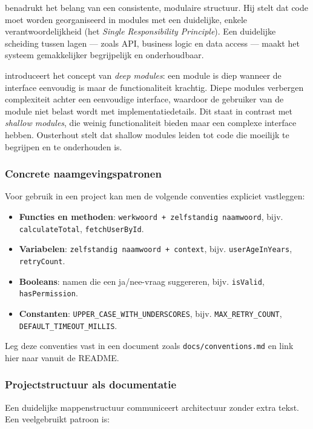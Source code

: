 \textcite{martin2008clean} benadrukt het belang van een consistente, modulaire structuur. Hij stelt dat code moet worden georganiseerd in modules met een duidelijke, enkele verantwoordelijkheid (het \textit{Single Responsibility Principle}). Een duidelijke scheiding tussen lagen --- zoals API, business logic en data access --- maakt het systeem gemakkelijker begrijpelijk en onderhoudbaar.

\textcite{ousterhout2018philosophy} introduceert het concept van \textit{deep modules}: een module is diep wanneer de interface eenvoudig is maar de functionaliteit krachtig. Diepe modules verbergen complexiteit achter een eenvoudige interface, waardoor de gebruiker van de module niet belast wordt met implementatiedetails. Dit staat in contrast met \textit{shallow modules}, die weinig functionaliteit bieden maar een complexe interface hebben. Ousterhout stelt dat shallow modules leiden tot code die moeilijk te begrijpen en te onderhouden is.

\subsubsection{Concrete naamgevingspatronen}
Voor gebruik in een project kan men de volgende conventies expliciet vastleggen:

\begin{itemize}
    \item \textbf{Functies en methoden}: \texttt{werkwoord + zelfstandig naamwoord}, bijv. \texttt{calculateTotal}, \texttt{fetchUserById}.
    \item \textbf{Variabelen}: \texttt{zelfstandig naamwoord + context}, bijv. \texttt{userAgeInYears}, \texttt{retryCount}.
    \item \textbf{Booleans}: namen die een ja/nee-vraag suggereren, bijv. \texttt{isValid}, \texttt{hasPermission}.
    \item \textbf{Constanten}: \texttt{UPPER\_CASE\_WITH\_UNDERSCORES}, bijv. \texttt{MAX\_RETRY\_COUNT}, \texttt{DEFAULT\_TIMEOUT\_MILLIS}.
\end{itemize}

Leg deze conventies vast in een document zoals \texttt{docs/conventions.md} en link hier naar vanuit de README.

\subsubsection{Projectstructuur als documentatie}
Een duidelijke mappenstructuur communiceert architectuur zonder extra tekst. Een veelgebruikt patroon is:

